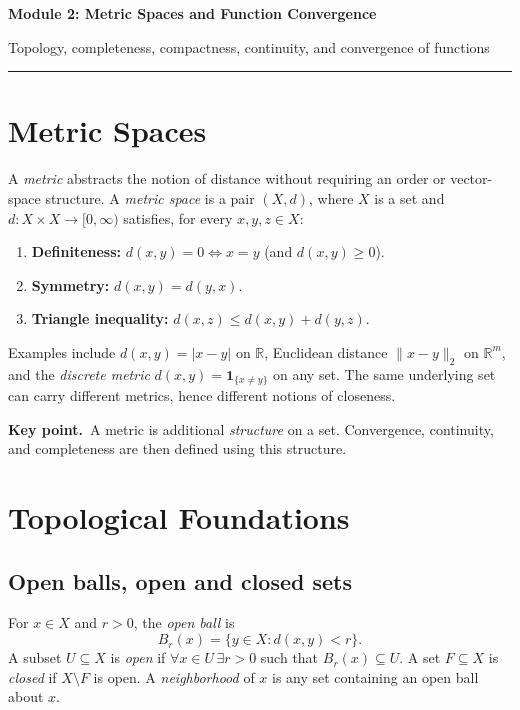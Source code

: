 \documentclass[10pt,a4paper]{article}
\newcommand{\R}{\mathbb R}
\newcommand{\key}[1]{\par\smallskip\textcolor{accent}{\textbf{Key point.}}\ #1\par}
\begin{document}
\begin{center}
  {\LARGE\bfseries Module 2: Metric Spaces and Function Convergence}\par
  \vspace{5pt}
  {\small\color{muted}Topology, completeness, compactness, continuity, and convergence of functions}\par
  \vspace{7pt}
  {\color{accent}\rule{0.88\linewidth}{0.7pt}}
\end{center}
\vspace{-4pt}

\section{Metric Spaces}
A \emph{metric} abstracts the notion of distance without requiring an order or vector-space structure. A \emph{metric space} is a pair $(X,d)$, where $X$ is a set and $d:X\times X\to[0,\infty)$ satisfies, for every $x,y,z\in X$:
\begin{enumerate}[label=(\roman*)]
\item \textbf{Definiteness:} $d(x,y)=0\iff x=y$ (and $d(x,y)\ge 0$).
\item \textbf{Symmetry:} $d(x,y)=d(y,x)$.
\item \textbf{Triangle inequality:} $d(x,z)\le d(x,y)+d(y,z)$.
\end{enumerate}
Examples include $d(x,y)=|x-y|$ on $\R$, Euclidean distance $\|x-y\|_2$ on $\R^m$, and the \emph{discrete metric} $d(x,y)=\mathbf1_{\{x\ne y\}}$ on any set. The same underlying set can carry different metrics, hence different notions of closeness.

\key{A metric is additional \emph{structure} on a set. Convergence, continuity, and completeness are then defined using this structure.}

\section{Topological Foundations}
\subsection{Open balls, open and closed sets}
For $x\in X$ and $r>0$, the \emph{open ball} is
\[
B_r(x)=\{y\in X:d(x,y)<r\}.
\]
A subset $U\subseteq X$ is \emph{open} if $\forall x\in U\,\exists r>0$ such that $B_r(x)\subseteq U$. A set $F\subseteq X$ is \emph{closed} if $X\setminus F$ is open. A \emph{neighborhood} of $x$ is any set containing an open ball about $x$.
\end{document}
